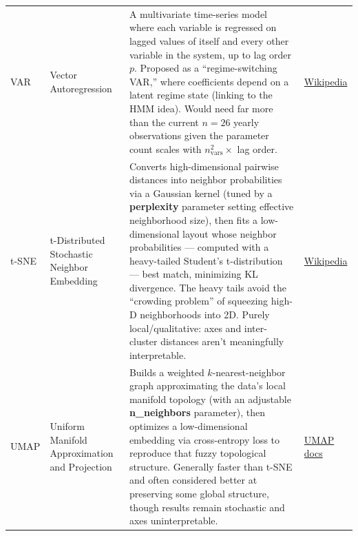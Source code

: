 \documentclass[10pt]{article}
\begin{document}
\begin{longtable}{P{2cm} P{3cm} P{9cm} P{2cm}}
VAR & Vector Autoregression &
A multivariate time-series model where each variable is regressed on lagged values of itself and every other variable in the system, up to lag order $p$. Proposed as a ``regime-switching VAR,'' where coefficients depend on a latent regime state (linking to the HMM idea). Would need far more than the current $n=26$ yearly observations given the parameter count scales with $n_{\text{vars}}^2 \times$ lag order. &
\href{https://en.wikipedia.org/wiki/Vector_autoregression}{Wikipedia} \\

t-SNE & t-Distributed Stochastic Neighbor Embedding &
Converts high-dimensional pairwise distances into neighbor probabilities via a Gaussian kernel (tuned by a \textbf{perplexity} parameter setting effective neighborhood size), then fits a low-dimensional layout whose neighbor probabilities --- computed with a heavy-tailed Student's t-distribution --- best match, minimizing KL divergence. The heavy tails avoid the ``crowding problem'' of squeezing high-D neighborhoods into 2D. Purely local/qualitative: axes and inter-cluster distances aren't meaningfully interpretable. &
\href{https://en.wikipedia.org/wiki/T-distributed_stochastic_neighbor_embedding}{Wikipedia} \\

UMAP & Uniform Manifold Approximation and Projection &
Builds a weighted $k$-nearest-neighbor graph approximating the data's local manifold topology (with an adjustable \textbf{n\_neighbors} parameter), then optimizes a low-dimensional embedding via cross-entropy loss to reproduce that fuzzy topological structure. Generally faster than t-SNE and often considered better at preserving some global structure, though results remain stochastic and axes uninterpretable. &
\href{https://umap-learn.readthedocs.io/en/latest/how_umap_works.html}{UMAP docs} \\

\bottomrule
\end{longtable}
\end{document}
